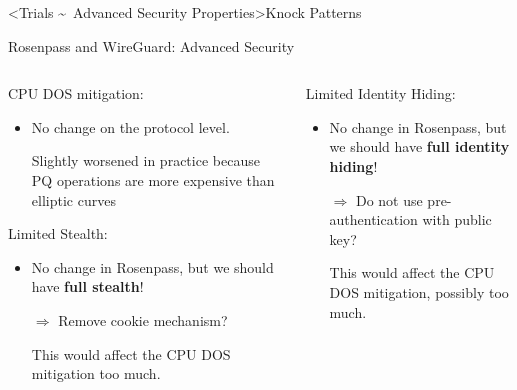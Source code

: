 \interlude[4]<Trials \textasciitilde\ Advanced Security Properties>{Knock Patterns}

\begin{frame}{Rosenpass and WireGuard: Advanced Security}
\vspace*{-\baselineskip}
\small
\begin{columns}[fullwidth,T]
	\setlength{}
  \begin{column}{.48\linewidth}
    \begin{block}{\strut CPU DOS mitigation:}
    \begin{itemize}
      \item No change on the protocol level.
      \item[{\Sey[][green!60!white]} ] Slightly worsened in practice because PQ operations are more expensive than elliptic curves
    \end{itemize}
        \unskip
    \end{block}
    \begin{block}{\strut Limited Stealth:}
    \begin{itemize}
      \item No change in Rosenpass, but we should have \textbf{full stealth}!
      \item[$\Rightarrow$] Remove cookie mechanism?
      \item[{\Sey[][green!60!white]} ] This would affect the CPU DOS mitigation too much.
    \end{itemize}
    \unskip
    \end{block}

  \end{column}

  \begin{column}{.48\linewidth}
    \begin{block}{\strut Limited Identity Hiding:}
    \begin{itemize}
      \item No change in Rosenpass, but we should have \textbf{full identity hiding}!
      \item[$\Rightarrow$] Do not use pre-authentication with public key?
      \item[{\Sey[][green!60!white]} ] This would affect the CPU DOS mitigation, possibly too much.
    \end{itemize}
        \unskip
    \end{block}
  \end{column}
\end{columns}
\end{frame}

